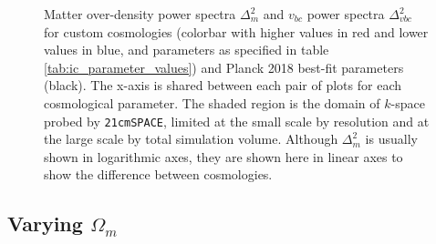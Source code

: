 \documentclass[floats,floatfix,showpacs,amssymb,prd,superscriptaddress,nofootinbib]{revtex4-2} %
\newcommand{\code}{\texttt}
\begin{document}
\begin{figure}[H]
\begin{subfigure}[b]{0.9\textwidth}
     \end{subfigure}
        \caption{Matter over-density power spectra $\Delta_m^2$ and $v_{bc}$ power spectra $\Delta_{vbc}^2$ for custom cosmologies (colorbar with higher values in red and lower values in blue, and parameters as specified in table \ref{tab:ic_parameter_values}) and Planck 2018 best-fit parameters (black). The x-axis is shared between each pair of plots for each cosmological parameter. The shaded region is the domain of $k$-space probed by \code{21cmSPACE}, limited at the small scale by resolution and at the large scale by total simulation volume. Although $\Delta_m^2$ is usually shown in logarithmic axes, they are shown here in linear axes to show the difference between cosmologies.}
        \label{fig:averaged_IC_power_spectra}
\end{figure}


\subsection{Varying $\Omega_m$}
\end{document}
